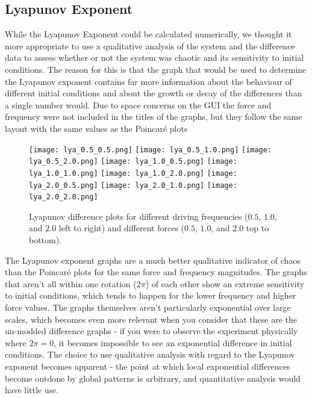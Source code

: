 \documentclass[11pt]{article} %
\begin{document}
    \subsection{Lyapunov Exponent}
    While the Lyapunov Exponent could be calculated numerically, we thought it more appropriate to use a qualitative analysis of the system and
    the difference data to assess whether or not the system was chaotic and its sensitivity to initial conditions. The reason for this is that
    the graph that would be used to determine the Lyapunov exponent contains far more information about the behaviour of different initial conditions
    and about the growth or decay of the differences than a single number would. Due to space concerns on the GUI the force and frequency were not
    included in the titles of the graphs, but they follow the same layout with the same values as the Poincar\'e plots
    \begin{figure}[H]
        \centering
        \texttt{[image: lya\_0.5\_0.5.png]}
        \texttt{[image: lya\_0.5\_1.0.png]}
        \texttt{[image: lya\_0.5\_2.0.png]}
        \texttt{[image: lya\_1.0\_0.5.png]}
        \texttt{[image: lya\_1.0\_1.0.png]}
        \texttt{[image: lya\_1.0\_2.0.png]}
        \texttt{[image: lya\_2.0\_0.5.png]}
        \texttt{[image: lya\_2.0\_1.0.png]}
        \texttt{[image: lya\_2.0\_2.0.png]}
        \caption{Lyapunov difference plots for different driving frequencies ($0.5$, $1.0$, and $2.0$ left to right) and different
        forces ($0.5$, $1.0$, and $2.0$ top to bottom).}
    \end{figure}
    The Lyapunov exponent graphs are a much better qualitative indicator of chaos than the Poincar\'e plots for the same force and frequency
    magnitudes. The graphs that aren't all within one rotation ($2\pi$) of each other show an extreme sensitivity to initial conditions, which
    tends to happen for the lower frequency and higher force values. The graphs themselves aren't particularly exponential over large scales, which
    becomes even more relevant when you consider that these are the un-modded difference graphs - if you were to observe the experiment physically
    where $2\pi = 0$, it becomes impossible to see an exponential difference in initial conditions. The choice to use qualitative analysis with regard
    to the Lyapunov exponent becomes apparent - the point at which local exponential differences become outdone by global patterns is arbitrary, and
    quantitative analysis would have little use.\\
\end{document}
